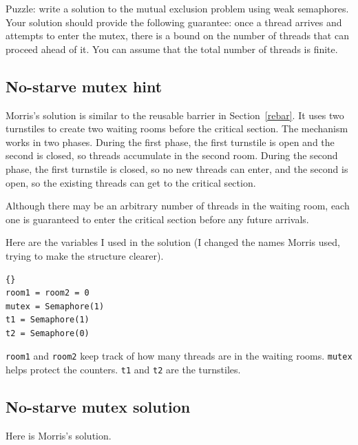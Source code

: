 \documentclass{book}
\newcommand{\clearemptydoublepage}{\newpage\cleardoublepage}
\begin{document}
Puzzle: write a solution to the mutual exclusion problem using weak
semaphores.  Your solution should provide the following guarantee:
once a thread arrives and attempts to enter the mutex, there is a
bound on the number of threads that can proceed ahead of it.  You can
assume that the total number of threads is finite.


\clearemptydoublepage
\subsection{No-starve mutex hint}
\label{morris}

Morris's solution is similar to the reusable barrier in
Section~\ref{rebar}.  It uses two turnstiles to create two waiting
rooms before the critical section.  The mechanism works in two phases.
During the first phase, the first turnstile is open and the second is
closed, so threads accumulate in the second room.  During the second
phase, the first turnstile is closed, so no new threads can enter, and
the second is open, so the existing threads can get to the critical
section.

Although there may be an arbitrary number of threads in the waiting
room, each one is guaranteed to enter the critical section before any
future arrivals.

Here are the variables I used in the solution (I changed the
names Morris used, trying to make the structure clearer).

\begin{latin}
\begin{latin}
\begin{lstlisting}[title={No-starve mutex hint}]{}
room1 = room2 = 0
mutex = Semaphore(1)
t1 = Semaphore(1)
t2 = Semaphore(0)
\end{lstlisting}
\end{latin}
\end{latin}

{\tt room1} and {\tt room2} keep track of how many threads are in the
waiting rooms.  {\tt mutex} helps protect the counters.  {\tt t1} and
{\tt t2} are the turnstiles.


\clearemptydoublepage
\subsection{No-starve mutex solution}

Here is Morris's solution.
\end{document}
